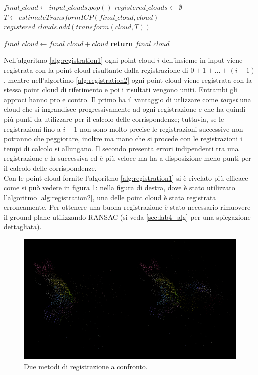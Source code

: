 \documentclass[a4paper]{article}
\begin{document}
	\begin{algorithm} 
		\caption{}
		\begin{algorithmic}
				\State $final\_cloud \gets input\_clouds.pop()$	
				\State $registered\_clouds \gets \emptyset$
					\State $T \gets estimateTransformICP(final\_cloud, cloud)$
					\State $registered\_clouds.add(transform(cloud,T))$
				\EndFor
				
					\State $final\_cloud \gets final\_cloud + cloud$
				\EndFor
				\State \textbf{return} $final\_cloud$
			\EndFunction
		\end{algorithmic}
	\label{alg:registration2}
	\end{algorithm}

	Nell'algoritmo \ref{alg:registration1} ogni point cloud $i$ dell'insieme in input viene registrata con la point cloud risultante dalla registrazione di $0 + 1 + \dots + (i-1)$, mentre nell'algortimo \ref{alg:registration2} ogni point cloud viene registrata con la stessa point cloud di riferimento e poi i risultati vengono uniti. Entrambi gli approci hanno pro e contro. Il primo ha il vantaggio di utlizzare come \textit{target} una cloud che si ingrandisce progressivamente ad ogni registrazione e che ha quindi più punti da utilizzare per il calcolo delle corrispondenze; tuttavia, se le registrazioni fino a $i-1$ non sono molto precise le registrazioni successive non potranno che peggiorare, inoltre ma mano che si procede con le registrazioni i tempi di calcolo si allungano. Il secondo presenta errori indipendenti tra una registrazione e la successiva ed è più veloce ma ha a disposizione meno punti per il calcolo delle corrispondenze.\\
	Con le point cloud fornite l'algoritmo \ref{alg:registration1} si è rivelato più efficace come si può vedere in figura \ref{fig:lab3}: nella figura di destra, dove è stato utilizzato l'algoritmo \ref{alg:registration2}, una delle point cloud è stata registrata erroneamente. Per ottenere una buona registrazione è stato necessario rimuovere il ground plane utilizzando RANSAC (si veda \ref{sec:lab4_alg} per una spiegazione dettagliata).
	
	\begin{figure}
		\centering
		\includegraphics[width=1\textwidth]{images/lab3.png}
		\caption{\label{fig:lab3}Due metodi di registrazione a confronto.}
	\end{figure}
\end{document}
